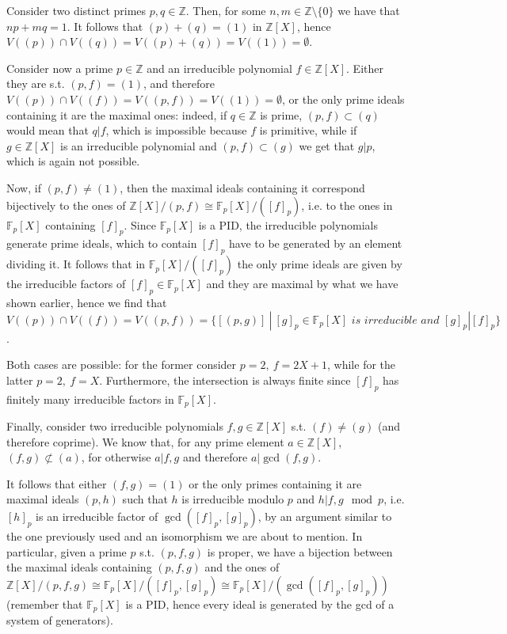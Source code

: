 \documentclass{article}
\newcommand{\numberset}{\mathbb}
\newcommand{\Z}{\numberset{Z}}
\newcommand{\F}{\numberset{F}}
\begin{document}
Consider two distinct primes $p,q\in\Z$. Then, for some $n,m\in\Z\setminus\{0\}$
we have that $np+mq=1$. It follows that $(p)+(q)=(1)$ in $\Z[X]$, hence
$V((p))\cap V((q))=V((p)+(q))=V((1))=\emptyset$.

Consider now a prime $p\in\Z$ and an irreducible polynomial $f\in\Z[X]$. Either
they are s.t. $(p,f)=(1)$, and therefore $V((p))\cap V((f))=V((p,f))=V((1))=
\emptyset$, or the only prime ideals containing it are the
maximal ones: indeed, if $q\in\Z$ is prime, $(p,f)\subset (q)$ would mean that
$q|f$, which is impossible because $f$ is primitive, while if $g\in\Z[X]$ is an
irreducible polynomial and $(p,f)\subset (g)$ we get that $g|p$, which is again
not possible.

Now, if $(p,f)\neq (1)$, then the maximal ideals containing it correspond
bijectively to the ones of $\Z[X]/(p,f)\cong\F_p[X]/([f]_p)$, i.e. to the ones
in $\F_p[X]$ containing $[f]_p$. Since $\F_p[X]$ is a PID, the irreducible
polynomials generate prime ideals, which to contain $[f]_p$ have to be generated
by an element dividing it. It follows that in $\F_p[X]/([f]_p)$ the only prime
ideals are given by the irreducible factors of $[f]_p\in\F_p[X]$ and
they are maximal by what we have shown earlier, hence we find that $V((p))\cap
V((f))=V((p,f))=\{[(p,g)]\ |\ [g]_p\in\F_p[X]\textit{ is irreducible and }
[g]_p|[f]_p\}$.

Both cases are possible: for the former consider $p=2,\ f=2X+1$, while for the
latter $p=2,\ f=X$. Furthermore, the intersection is always finite since
$[f]_p$ has finitely many irreducible factors in $\F_p[X]$.

Finally, consider two irreducible polynomials $f,g\in\Z[X]$ s.t. $(f)\neq
(g)$ (and therefore coprime). We know that, for any prime element $a\in\Z[X]$,
$(f,g)\not\subset (a)$, for otherwise $a|f,g$ and therefore $a|\gcd(f,g)$.

It follows that either $(f,g)=(1)$ or the only primes containing it are maximal
ideals $(p,h)$ such that $h$ is irreducible modulo $p$ and $h|f,g\mod p$, i.e.
$[h]_p$ is an irreducible factor of $\gcd([f]_p,[g]_p)$, by an argument similar
to the one previously used and an isomorphism we are about to mention. In particular,
given a prime $p$ s.t. $(p,f,g)$ is proper, we have a bijection between
the maximal ideals containing $(p,f,g)$ and the ones of
$\Z[X]/(p,f,g)\cong\F_p[X]/([f]_p,[g]_p)\cong\F_p[X]/(\gcd([f]_p,[g]_p))$
(remember that $\F_p[X]$ is a PID, hence every ideal is generated by the gcd of
a system of generators).
\end{document}
